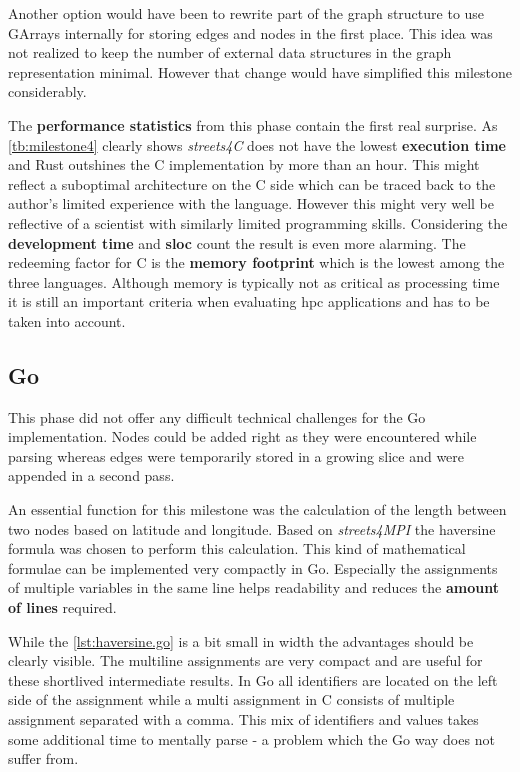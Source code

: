 Another option would have been to rewrite part of the graph structure to use GArrays internally for storing edges and nodes in the first place. This idea was not realized to keep the number of external data structures in the graph representation minimal. However that change would have simplified this milestone considerably.

The \textbf{performance statistics} from this phase contain the first real surprise. As \autoref{tb:milestone4} clearly shows \textit{streets4C} does not have the lowest \textbf{execution time} and Rust outshines the C implementation by more than an hour. This might reflect a suboptimal architecture on the C side which can be traced back to the author's limited experience with the language. However this might very well be reflective of a scientist with similarly limited programming skills. Considering the \textbf{development time} and \textbf{\gls{sloc}} count the result is even more alarming. The redeeming factor for C is the \textbf{memory footprint} which is the lowest among the three languages. Although memory is typically not as critical as processing time it is still an important criteria when evaluating \gls{hpc} applications and has to be taken into account.

\subsection{Go}
\label{subsec:Implementation::SequentialBenchmark::Go}

This phase did not offer any difficult technical challenges for the Go implementation. Nodes could be added right as they were encountered while parsing whereas edges were temporarily stored in a growing slice and were appended in a second pass.

An essential function for this milestone was the calculation of the length between two nodes based on latitude and longitude. Based on \textit{streets4MPI} the haversine formula was chosen to perform this calculation. This kind of mathematical formulae can be implemented very compactly in Go. Especially the assignments of multiple variables in the same line helps readability and reduces the \textbf{amount of lines} required.

While the \autoref{lst:haversine.go} is a bit small in width the advantages should be clearly visible. The multiline assignments are very compact and are useful for these shortlived intermediate results. In Go all identifiers are located on the left side of the assignment while a multi assignment in C consists of multiple assignment separated with a comma. This mix of identifiers and values takes some additional time to mentally parse - a problem which the Go way does not suffer from.
\\


